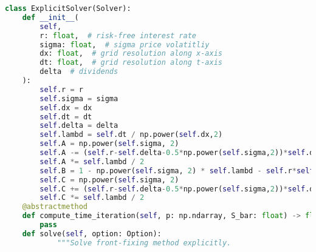 \begin{lstlisting}[language=Python, caption=Explicit solver for Company transformation.]
class ExplicitSolver(Solver):
    def __init__(
        self,
        r: float,  # risk-free interest rate
        sigma: float,  # sigma price volatitliy
        dx: float,  # grid resolution along x-axis
        dt: float,  # grid resolution along t-axis
        delta  # dividends
    ): 
        self.r = r
        self.sigma = sigma
        self.dx = dx
        self.dt = dt
        self.delta = delta    
        self.lambd = self.dt / np.power(self.dx,2)
        self.A = np.power(self.sigma, 2)
        self.A -= (self.r-self.delta-0.5*np.power(self.sigma,2))*self.dx
        self.A *= self.lambd / 2
        self.B = 1 - np.power(self.sigma, 2) * self.lambd - self.r*self.dt
        self.C = np.power(self.sigma, 2) 
        self.C += (self.r-self.delta-0.5*np.power(self.sigma,2))*self.dx
        self.C *= self.lambd / 2
    @abstractmethod
    def compute_time_iteration(self, p: np.ndarray, S_bar: float) -> float:
        pass
    def solve(self, option: Option):
            """Solve front-fixing method explicitly.


\end{lstlisting}

